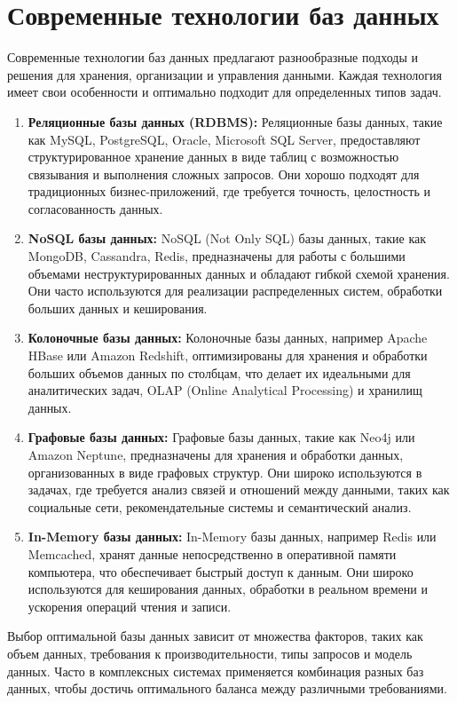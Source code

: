 \section{Современные технологии баз данных}
Современные технологии баз данных предлагают разнообразные подходы и решения для хранения, организации и управления данными. 
Каждая технология имеет свои особенности и оптимально подходит для определенных типов задач.

\begin{enumerate}
    \item \textbf{Реляционные базы данных (RDBMS):} Реляционные базы данных, 
    такие как MySQL, PostgreSQL, Oracle, Microsoft SQL Server, 
    предоставляют структурированное хранение данных в виде таблиц с возможностью связывания и выполнения сложных запросов. 
    Они хорошо подходят для традиционных бизнес-приложений, где требуется точность, целостность и согласованность данных.
    \item \textbf{NoSQL базы данных:} NoSQL (Not Only SQL) базы данных, 
    такие как MongoDB, Cassandra, Redis, 
    предназначены для работы с большими объемами неструктурированных данных и обладают гибкой схемой хранения. 
    Они часто используются для реализации распределенных систем, обработки больших данных и кеширования.
    \item \textbf{Колоночные базы данных:} Колоночные базы данных, например Apache HBase или Amazon Redshift, 
    оптимизированы для хранения и обработки больших объемов данных по столбцам, что делает их идеальными для аналитических задач, OLAP (Online Analytical Processing) и хранилищ данных.
    \item \textbf{Графовые базы данных:} Графовые базы данных, такие как Neo4j или Amazon Neptune, 
    предназначены для хранения и обработки данных, организованных в виде графовых структур. 
    Они широко используются в задачах, где требуется анализ связей и отношений между данными, 
    таких как социальные сети, рекомендательные системы и семантический анализ.
    \item \textbf{In-Memory базы данных:} In-Memory базы данных, например Redis или Memcached, 
    хранят данные непосредственно в оперативной памяти компьютера, что обеспечивает быстрый доступ к данным. 
    Они широко используются для кеширования данных, обработки в реальном времени и ускорения операций чтения и записи.
\end{enumerate}

Выбор оптимальной базы данных зависит от множества факторов, 
таких как объем данных, требования к производительности, типы запросов и модель данных. 
Часто в комплексных системах применяется комбинация разных баз данных, 
чтобы достичь оптимального баланса между различными требованиями.

